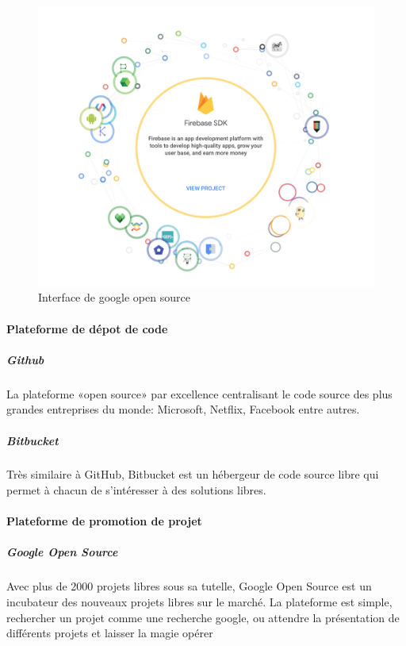 				\begin{figure}[h]
					\center
					\includegraphics[scale=0.40]{./img/google_os}
					\caption{Interface de google open source}					
				\end{figure}


			\paragraph{Plateforme de dépot de code}

				\subparagraph{Github\\}
				La plateforme «open source» par excellence centralisant le code source des plus grandes entreprises du monde: Microsoft, Netflix, Facebook entre autres.
			
				\subparagraph{Bitbucket\\}
				Très similaire à GitHub, Bitbucket est un hébergeur de code source libre qui permet à chacun de s’intéresser à des solutions libres.

			\paragraph{Plateforme de promotion de projet}

				\subparagraph{Google Open Source\\}

				Avec plus de 2000 projets libres sous sa tutelle, Google Open Source est un incubateur des nouveaux projets libres sur le marché.
				La plateforme est simple, rechercher un projet comme une recherche google, ou attendre la présentation de différents projets et laisser la magie opérer 

